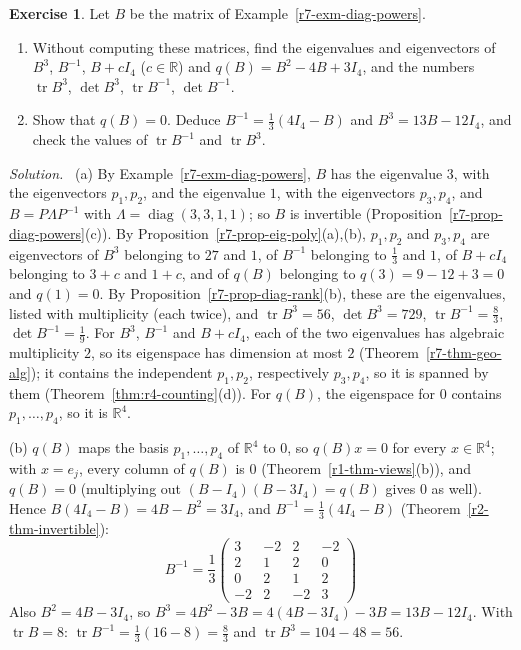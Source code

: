 \documentclass[12pt]{article}
\newcommand{\R}{\mathbb R}
\DeclareMathOperator{\tr}{tr}
\DeclareMathOperator{\diag}{diag}
\theoremstyle{definition}
\newtheorem{exercise}{Exercise}
\newenvironment{solution}{\par\noindent\textit{Solution.}\ }{\par\smallskip}
\begin{document}
\begin{exercise}\label{r7-ex-functions}
Let \(B\) be the matrix of Example~\ref{r7-exm-diag-powers}.
\begin{enumerate}
\item Without computing these matrices, find the eigenvalues and eigenvectors of \(B^3\), \(B^{-1}\), \(B+cI_4\)
(\(c\in\R\)) and \(q(B)=B^2-4B+3I_4\), and the numbers \(\tr B^3\), \(\det B^3\), \(\tr B^{-1}\), \(\det B^{-1}\).
\item Show that \(q(B)=0\). Deduce \(B^{-1}=\frac13(4I_4-B)\) and \(B^3=13B-12I_4\), and check the values of
\(\tr B^{-1}\) and \(\tr B^3\).
\end{enumerate}
\end{exercise}
\begin{solution}
(a) By Example~\ref{r7-exm-diag-powers}, \(B\) has the eigenvalue \(3\), with the eigenvectors \(p_1,p_2\), and the
eigenvalue \(1\), with the eigenvectors \(p_3,p_4\), and \(B=P\Lambda P^{-1}\) with \(\Lambda=\diag(3,3,1,1)\); so \(B\)
is invertible (Proposition~\ref{r7-prop-diag-powers}(c)). By Proposition~\ref{r7-prop-eig-poly}(a),(b), \(p_1,p_2\) and
\(p_3,p_4\) are eigenvectors of \(B^3\) belonging to \(27\) and \(1\), of \(B^{-1}\) belonging to \(\frac13\) and \(1\), of
\(B+cI_4\) belonging to \(3+c\) and \(1+c\), and of \(q(B)\) belonging to \(q(3)=9-12+3=0\) and \(q(1)=0\). By
Proposition~\ref{r7-prop-diag-rank}(b), these are the eigenvalues, listed with multiplicity (each twice), and
\(\tr B^3=56\), \(\det B^3=729\), \(\tr B^{-1}=\frac83\), \(\det B^{-1}=\frac19\). For \(B^3\), \(B^{-1}\) and \(B+cI_4\),
each of the two eigenvalues has algebraic multiplicity \(2\), so its eigenspace has dimension at most \(2\)
(Theorem~\ref{r7-thm-geo-alg}); it contains the independent \(p_1,p_2\), respectively \(p_3,p_4\), so it is spanned by them
(Theorem~\ref{thm:r4-counting}(d)). For \(q(B)\), the eigenspace for \(0\) contains \(p_1,\dots,p_4\), so it is \(\R^4\).

(b) \(q(B)\) maps the basis \(p_1,\dots,p_4\) of \(\R^4\) to \(0\), so \(q(B)x=0\) for every \(x\in\R^4\); with
\(x=e_j\), every column of \(q(B)\) is \(0\) (Theorem~\ref{r1-thm-views}(b)), and \(q(B)=0\) (multiplying out
\((B-I_4)(B-3I_4)=q(B)\) gives \(0\) as well). Hence \(B(4I_4-B)=4B-B^2=3I_4\), and \(B^{-1}=\frac13(4I_4-B)\)
(Theorem~\ref{r2-thm-invertible}):
\[
B^{-1}=\frac13\begin{pmatrix}3&-2&2&-2\\2&1&2&0\\0&2&1&2\\-2&2&-2&3\end{pmatrix}
\]
Also \(B^2=4B-3I_4\), so \(B^3=4B^2-3B=4(4B-3I_4)-3B=13B-12I_4\). With \(\tr B=8\): \(\tr B^{-1}=\frac13(16-8)=\frac83\)
and \(\tr B^3=104-48=56\).
\end{solution}
\end{document}
